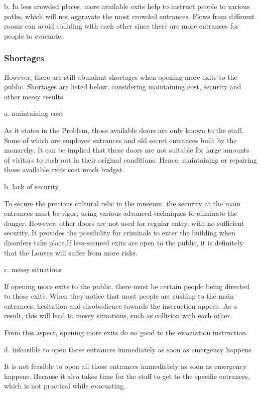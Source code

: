 \documentclass{mcmthesis}
\begin{document}
	b. In less crowded places, more available exits help to instruct people to various paths, which will not aggravate the most crowded entrances. Flows from different rooms can avoid colliding with each other since there are more entrances for people to evacuate.
	
	\subsubsection{Shortages}
	
	However, there are still abundant shortages when opening more exits to the public. Shortages are listed below, considering maintaining cost, security and other messy results.
	
	a. maintaining cost
	
	As it states in the Problem, those available doors are only known to the staff. Some of which are employee entrances and old secret entrances built by the monarchy. It can be implied that these doors are not suitable for large amounts of visitors to rush out in their original conditions. Hence, maintaining or repairing those available exits cost much budget.
	
	b. lack of security
	
	To secure the precious cultural relic in the museum, the security at the main entrances must be rigor, using various advanced techniques to eliminate the danger. However, other doors are not used for regular entry, with no sufficient security. It provides the possibility for criminals to enter the building when disorders take place.If less-secured exits are open to the public, it is definitely that the Louvre will suffer from more risks.
	
	c. messy situations
	
	If opening more exits to the public, there must be certain people being directed to those exits. When they notice that most people are rushing to the main entrances, hesitation and disobedience towards the instruction appear. As a result, this will lead to messy situations, such as collision with each other.
	
	From this aspect, opening more exits do no good to the evacuation instruction.
	
	d. infeasible to open those entrances immediately as soon as emergency happens
	
	It is not feasible to open all those entrances immediately as soon as emergency happens. Because it also takes time for the staff to get to the specific entrances, which is not practical while evacuating.
	
\end{document}
